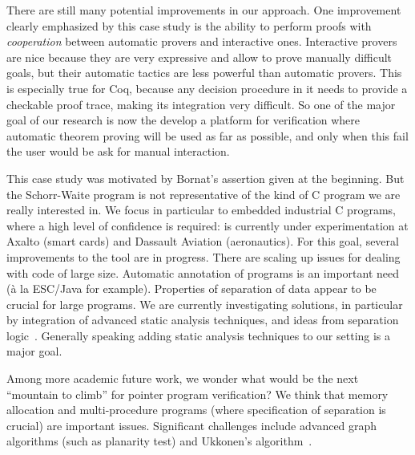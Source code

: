 There are still many potential improvements in our approach. One
improvement clearly emphasized by this case study is the ability to
perform proofs with \emph{cooperation} between automatic provers and
interactive ones. Interactive provers are nice because they are very
expressive and allow to prove manually difficult goals, but their
automatic tactics are less powerful than automatic provers. This is
especially true for Coq, because any decision procedure in it needs to
provide a checkable proof trace, making its integration very
difficult. So one of the major goal of our research is now the develop
a platform for verification where automatic theorem proving will be
used as far as possible, and only when this fail the user would be ask
for manual interaction.

This case study was motivated by Bornat's assertion given at the
beginning. But the Schorr-Waite program is not representative of the
kind of C program we are really interested in. We focus in particular
to embedded industrial C programs, where a high level of confidence is
required: \caduceus{} is currently under experimentation at Axalto
(smart cards) and Dassault Aviation (aeronautics). For this goal,
several improvements to the \caduceus{} tool are in progress. There
are scaling up issues for dealing with code of large size. Automatic
annotation of programs is an important need (\`a la ESC/Java for
example). Properties of separation of data appear to be crucial for
large programs. We are currently investigating solutions, in
particular by integration of advanced static analysis techniques, and
ideas from separation logic~\cite{reynolds02lics}. Generally speaking
adding static analysis techniques to our setting is a major goal.

Among more academic future work, we wonder what would be the next
``mountain to climb'' for pointer program verification? We think that
memory allocation and multi-procedure programs (where specification of
separation is crucial) are important issues. Significant challenges
include advanced graph algorithms (such as planarity test) and
Ukkonen's algorithm~\cite{ukkonen95}.



